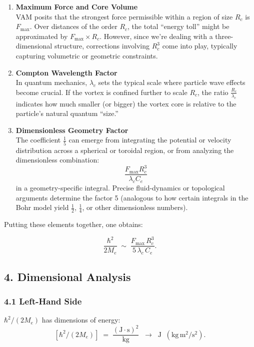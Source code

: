 \documentclass[aps,preprint,superscriptaddress]{revtex4-2}
\begin{document}
    \begin{enumerate}
        \item \textbf{Maximum Force and Core Volume} \\
    VAM posits that the strongest force permissible within a region of size \(R_c\) is \(F_{\max}\). Over distances of the order \(R_c\), the total “energy toll” might be approximated by \(F_{\max} \times R_c\). However, since we’re dealing with a three-dimensional structure, corrections involving \(R_c^3\) come into play, typically capturing volumetric or geometric constraints.
        \item \textbf{Compton Wavelength Factor} \\
    In quantum mechanics, \(\lambda_c\) sets the typical scale where particle wave effects become crucial. If the vortex is confined further to scale \(R_c\), the ratio \(\tfrac{R_c}{\lambda_c}\) indicates how much smaller (or bigger) the vortex core is relative to the particle’s natural quantum “size.”
        \item \textbf{Dimensionless Geometry Factor} \\
    The coefficient \(\frac{1}{5}\) can emerge from integrating the potential or velocity distribution across a spherical or toroidal region, or from analyzing the dimensionless combination:
    \[
        \frac{F_{\max} R_c^3}{\lambda_c C_e}
    \]
    in a geometry-specific integral. Precise fluid-dynamics or topological arguments determine the factor 5 (analogous to how certain integrals in the Bohr model yield \(\tfrac12\), \(\tfrac14\), or other dimensionless numbers).
    \end{enumerate}

    Putting these elements together, one obtains:

    \[
        \frac{\hbar^2}{2M_e}
        \;\sim\;
        \frac{F_{\max} \,R_c^3}{5 \,\lambda_c \,C_e}.
    \]

    \subsection*{4. Dimensional Analysis}

    \subsubsection*{4.1 Left-Hand Side}
    \(\hbar^2/(2 M_e)\) has dimensions of energy:
    \[
        [\hbar^2/(2 M_e)]
        \;=\;
        \frac{(\mathrm{J\cdot s})^2}{\mathrm{kg}}
        \;\;\rightarrow\;\;
        \mathrm{J} \;\;(\mathrm{kg\,m^2/s^2}).
    \]
\end{document}

